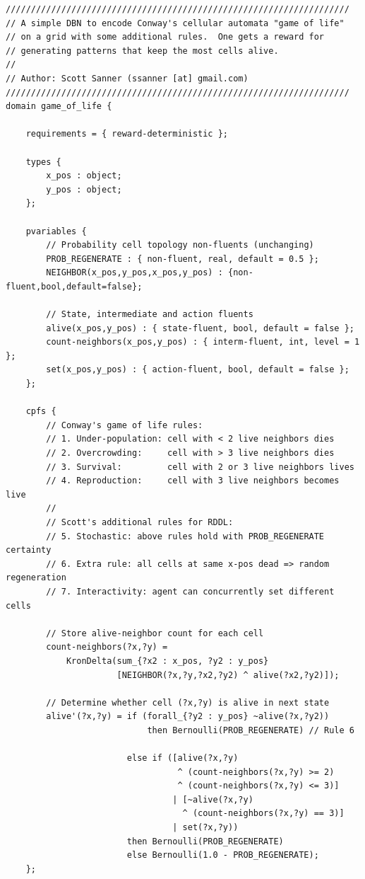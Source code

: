 \documentclass[11pt,a4paper]{article}
\begin{document}
\newpage
\begin{lstlisting}[title=game\_of\_life\_stoch.rddl]
////////////////////////////////////////////////////////////////////
// A simple DBN to encode Conway's cellular automata "game of life" 
// on a grid with some additional rules.  One gets a reward for 
// generating patterns that keep the most cells alive.
//
// Author: Scott Sanner (ssanner [at] gmail.com)
////////////////////////////////////////////////////////////////////
domain game_of_life {
  	
	requirements = { reward-deterministic };

	types { 
		x_pos : object;
		y_pos : object; 
	};
      	
	pvariables { 
		// Probability cell topology non-fluents (unchanging)
		PROB_REGENERATE : { non-fluent, real, default = 0.5 };
		NEIGHBOR(x_pos,y_pos,x_pos,y_pos) : {non-fluent,bool,default=false};
		
		// State, intermediate and action fluents
		alive(x_pos,y_pos) : { state-fluent, bool, default = false };
		count-neighbors(x_pos,y_pos) : { interm-fluent, int, level = 1 }; 
		set(x_pos,y_pos) : { action-fluent, bool, default = false };
	};
  
	cpfs {
		// Conway's game of life rules:
		// 1. Under-population: cell with < 2 live neighbors dies
   		// 2. Overcrowding:     cell with > 3 live neighbors dies
   		// 3. Survival:         cell with 2 or 3 live neighbors lives 
   		// 4. Reproduction:     cell with 3 live neighbors becomes live
   		//
   		// Scott's additional rules for RDDL:
   		// 5. Stochastic: above rules hold with PROB_REGENERATE certainty
   		// 6. Extra rule: all cells at same x-pos dead => random regeneration
   		// 7. Interactivity: agent can concurrently set different cells
		
		// Store alive-neighbor count for each cell
		count-neighbors(?x,?y) = 
		    KronDelta(sum_{?x2 : x_pos, ?y2 : y_pos} 
		              [NEIGHBOR(?x,?y,?x2,?y2) ^ alive(?x2,?y2)]);

		// Determine whether cell (?x,?y) is alive in next state
		alive'(?x,?y) = if (forall_{?y2 : y_pos} ~alive(?x,?y2))
							then Bernoulli(PROB_REGENERATE) // Rule 6

						else if ([alive(?x,?y)  
						          ^ (count-neighbors(?x,?y) >= 2)  
						          ^ (count-neighbors(?x,?y) <= 3)]
						         | [~alive(?x,?y) 
							       ^ (count-neighbors(?x,?y) == 3)]
						         | set(?x,?y))
						then Bernoulli(PROB_REGENERATE)
						else Bernoulli(1.0 - PROB_REGENERATE);
	};
    

\end{lstlisting}
\end{document}
